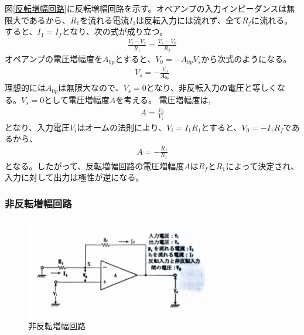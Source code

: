 \documentclass[a4paper,11pt,uplatex]{jsarticle}
\begin{document}
図\ref{反転増幅回路}に反転増幅回路を示す。オペアンプの入力インピーダンスは無限大であるから、$R_1$を流れる電流$I_1$は反転入力には流れず、全て$R_f$に流れる。
すると、$I_1 = I_f$となり、次の式が成り立つ。
\begin{align}
  \frac{V_i-V_s}{R_1} = \frac{V_s-V_0}{R_f}
\end{align}
オペアンプの電圧増幅度を$A_{0p}$とすると、$V_0 = -A_{0p}V_s$から次式のようになる。
\begin{align}
  V_s = -\frac{V_0}{A_{0p}}
\end{align}
理想的には$A_{0p}$は無限大なので、$V_s = 0$となり、非反転入力の電圧と等しくなる。$V_s = 0$として電圧増幅度$A$を考える。
電圧増幅度は,
\begin{align}
  A = \frac{V_0}{V_i}
\end{align}
となり、入力電圧$V_i$はオームの法則により、$V_i = I_1R_1$とすると、$V_0 = -I_1R_f$であるから、
\begin{align}
  A = -\frac{R_f}{R_1}
\end{align}
となる。したがって、反転増幅回路の電圧増幅度$A$は$R_f$と$R_1$によって決定され、入力に対して出力は極性が逆になる。

\subsubsection{非反転増幅回路}
\begin{figure}[H]
	\begin{center}
		\includegraphics[width=8cm]{画像/非反転増幅回路.png}
		\caption{非反転増幅回路}
		\label{非反転増幅回路}
	\end{center}
\end{figure}
\end{document}
